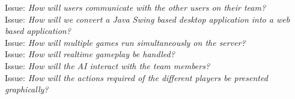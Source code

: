 Issue: \textit{How will users communicate with the other users on their team?}
\\

Issue: \textit{How will we convert a Java Swing based desktop application into a web based application?}
\\

Issue: \textit{How will multiple games run simultaneously on the server?}
\\

Issue: \textit{How will realtime gameplay be handled?}
\\

Issue: \textit{How will the AI interact with the team members?}
\\

Issue: \textit{How will the actions required of the different players be presented graphically?}
\\
